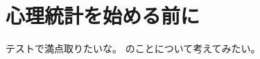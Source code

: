 \documentclass{ltjsbook}
\begin{document}
 
\chapter{心理統計を始める前に} 
テストで満点取りたいな。
のことについて考えてみたい。

\printindex
\end{document}
